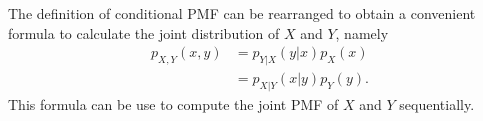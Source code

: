%

The definition of conditional PMF can be rearranged to obtain a convenient formula to calculate the joint distribution of $X$ and $Y$, namely
\begin{equation*}
\begin{split}
p_{X,Y} (x,y) &= p_{Y|X} (y|x) p_X (x) \\
& = p_{X|Y} (x|y) p_Y (y) .
\end{split}
\end{equation*}
This formula can be use to compute the joint PMF of $X$ and $Y$ sequentially.

